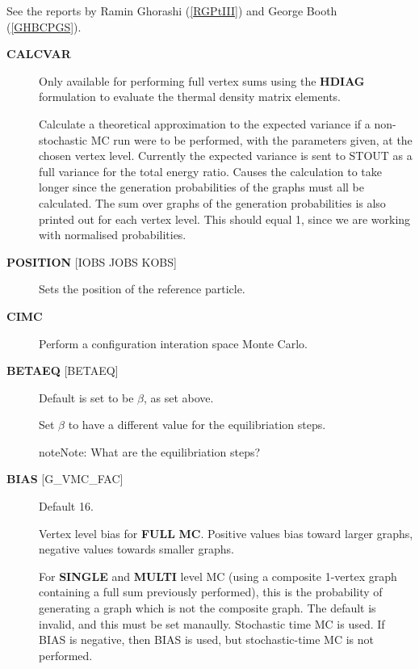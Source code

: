 \documentclass[openany,a4paper,10pt,english]{manual}
\begin{document}
See the reports by Ramin Ghorashi (\hyperlink{rgptiii}{{[}RGPtIII{]}}) and George Booth
(\hyperlink{ghbcpgs}{{[}GHBCPGS{]}}).
\begin{description}
\item[\textbf{CALCVAR}] \leavevmode
Only available for performing full vertex sums using the \textbf{HDIAG}
formulation to evaluate the thermal density matrix elements.

Calculate a theoretical approximation to the expected variance if a
non-stochastic MC run were to be performed, with the parameters given,
at the chosen vertex level.  Currently the expected variance is sent
to STOUT as a full variance for the total energy ratio.  Causes the
calculation to take longer since the generation probabilities of
the graphs must all be calculated.  The sum over graphs of the
generation probabilities is also printed out for each vertex
level. This should equal 1, since we are working with normalised
probabilities.

\item[\textbf{POSITION} {[}IOBS JOBS KOBS{]}] \leavevmode
Sets the position of the reference particle.

\item[\textbf{CIMC}] \leavevmode
Perform a configuration interation space Monte Carlo.

\item[\textbf{BETAEQ} {[}BETAEQ{]}] \leavevmode
Default is set to be $\beta$, as set above.

Set $\beta$ to have a different value for the equilibriation steps.

\begin{notice}{note}{Note:}
What are the equilibriation steps?
\end{notice}

\item[\textbf{BIAS} {[}G\_VMC\_FAC{]}] \leavevmode
Default 16.

Vertex level bias for \textbf{FULL} \textbf{MC}. Positive values bias toward
larger graphs, negative values towards smaller graphs.

For \textbf{SINGLE} and \textbf{MULTI} level MC (using a composite 1-vertex
graph containing a full sum previously performed), this is the
probability of generating a graph which is not the composite graph.
The default is invalid, and this must be set manaully.  Stochastic
time MC is used.  If BIAS is negative, then \textbar{} BIAS \textbar{} is used, but
stochastic-time MC is not performed.


\end{description}
\end{document}
